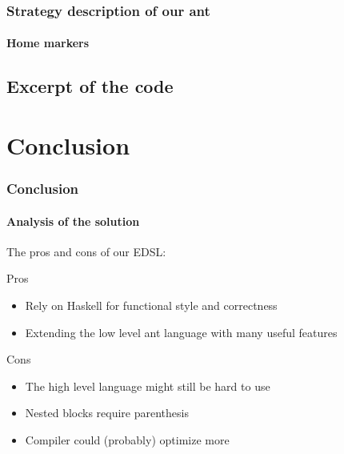 \documentclass{beamer}
\begin{document}
\begin{frame}
  \frametitle{Strategy description of our ant}
  \framesubtitle{Home markers}
\begin{center}
  \end{center}
\end{frame}

\subsection{Excerpt of the code}

\section{Conclusion}

\begin{frame}
  \frametitle{Conclusion}
  \framesubtitle{Analysis of the solution}
  The pros and cons of our EDSL:\pause
  \begin{block}{Pros}
	\begin{itemize}
	\item Rely on Haskell for functional style and correctness
	\pause \item Extending the low level ant language with many useful features
	\end{itemize}
  \end{block}
  \pause
  \begin{block}{Cons}
	\begin{itemize}
	\item The high level language might still be hard to use
	\pause \item Nested blocks require parenthesis
	\pause \item Compiler could (probably) optimize more
	\end{itemize}
  \end{block}\end{frame}
\end{document}

